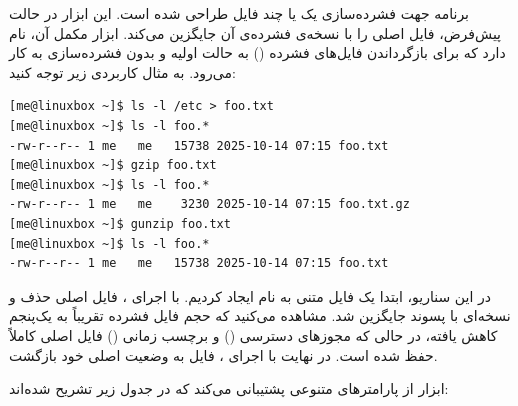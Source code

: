 برنامه  جهت فشرده‌سازی یک یا چند فایل طراحی شده است. این ابزار در حالت پیش‌فرض، فایل اصلی را با نسخه‌ی فشرده‌ی آن جایگزین می‌کند. ابزار مکمل آن،  نام دارد که برای بازگرداندن فایل‌های فشرده () به حالت اولیه و بدون فشرده‌سازی به کار می‌رود. به مثال کاربردی زیر توجه کنید:

\begin{latin}
\begin{lstlisting}
[me@linuxbox ~]$ ls -l /etc > foo.txt
[me@linuxbox ~]$ ls -l foo.*
-rw-r--r-- 1 me   me   15738 2025-10-14 07:15 foo.txt
[me@linuxbox ~]$ gzip foo.txt
[me@linuxbox ~]$ ls -l foo.*
-rw-r--r-- 1 me   me    3230 2025-10-14 07:15 foo.txt.gz
[me@linuxbox ~]$ gunzip foo.txt
[me@linuxbox ~]$ ls -l foo.*
-rw-r--r-- 1 me   me   15738 2025-10-14 07:15 foo.txt
\end{lstlisting}
\end{latin}

در این سناریو، ابتدا یک فایل متنی به نام  ایجاد کردیم. با اجرای ، فایل اصلی حذف و نسخه‌ای با پسوند  جایگزین شد. مشاهده می‌کنید که حجم فایل فشرده تقریباً به یک‌پنجم کاهش یافته، در حالی که مجوزهای دسترسی () و برچسب زمانی () فایل اصلی کاملاً حفظ شده است. در نهایت با اجرای ، فایل به وضعیت اصلی خود بازگشت.

ابزار  از پارامترهای متنوعی پشتیبانی می‌کند که در جدول زیر تشریح شده‌اند:

